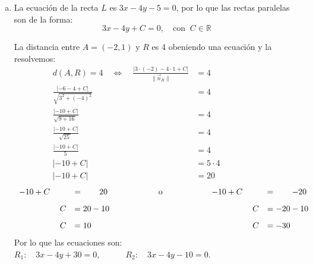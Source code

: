 \documentclass[11pt]{article}
\newcommand{\R}{\mathbb{R}}
\begin{document}
\begin{enumerate}[\hspace{-5mm} 1) ]
\begin{enumerate}[(a)]
\begin{center}
\end{center}
    


 






\bigskip
    \item La ecuación de la recta $L$ es $3x - 4y - 5 = 0$,  por lo que las rectas paralelas son de la forma:
    \[ 3x - 4y + C = 0, \quad \text{con } \ C\in \R \]
    
    La distancia entre $A=(-2,1)$ y $R$ es 4 obeniendo una ecuación y la resolvemos:
    \begin{align*}
        d (A,R)= 4 \quad \Longleftrightarrow \quad   \frac{|3\cdot (-2) - 4 \cdot 1 + C|}{\|\vec{n}_R \|} &= 4  \qquad\qquad\qquad
        \\
        \frac{|-6 - 4 + C|}{\sqrt{3^2 + (-4)^2}} 
        &= 4
        \\
        \frac{|-10 + C|}{\sqrt{9 + 16\, }\, } 
        &= 4
        \\
        \frac{|-10 + C|}{\sqrt{25\, }\, } 
        &= 4
        \\
        \frac{|-10+C|}{5\, } 
        &= 4 
        \\
         |-10+ C|  
        &= 5 \cdot 4  
        \\
         |-10 + C|  
        &= 20 
\end{align*} 
\[
\begin{array}{rl@{\hspace{20mm}}c @{\hspace{20mm}} rl r}   
-10 + C
\qquad
&= \qquad
20
& \mbox{ o }
&
-10  + C
\qquad
&= \qquad
-20 
\\[3mm] %
C
&= 
20-10
& %
&
C 
&= 
-20-10
\\[3mm] %
C
&= 
10
& %
&
C  
&= 
-30
\end{array}
\]
Por lo que las ecuaciones son:\qquad 
$ R_1: \quad 3x - 4y +30 = 0, \quad\qquad R_2:\quad 3x - 4y -10 = 0.$


\end{enumerate}
\end{enumerate}
\end{document}
